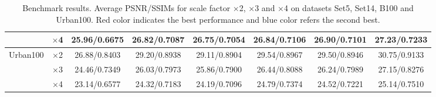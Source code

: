 \documentclass[10pt,twocolumn,letterpaper]{article}
\begin{document}
\begin{table}
\begin{center}
\begin{tabular}{ | c | c | c | c | c | c | c | c | }
 & $\times$4 & 25.96/0.6675 & 26.82/0.7087 & 26.75/0.7054 & 26.84/{\color{blue}0.7106} & {\color{blue}26.90}/0.7101 & {\color{red}27.23}/{\color{red}0.7233}\\
\hline
\hline
\multirow{3}{*}{Urban100} & $\times$2 & 26.88/0.8403 & 29.20/0.8938 & 29.11/0.8904 & {\color{blue}29.54}/{\color{blue}0.8967} & 29.50/0.8946 & {\color{red}30.75}/{\color{red}0.9133}\\
 & $\times$3 & 24.46/0.7349 & 26.03/0.7973 & 25.86/0.7900 & {\color{blue}26.44}/{\color{blue}0.8088} & 26.24/0.7989 & {\color{red}27.15}/{\color{red}0.8276}\\
 & $\times$4 & 23.14/0.6577 & 24.32/0.7183 & 24.19/0.7096 & {\color{blue}24.79}/{\color{blue}0.7374} & 24.52/0.7221 & {\color{red}25.14}/{\color{red}0.7510}\\
\hline
\end{tabular}
\caption{Benchmark results. Average PSNR/SSIMs for scale factor $\times$2, $\times$3 and $\times$4 on datasets Set5, Set14, B100 and Urban100. {\color{red}Red color} indicates the best performance and {\color{blue}blue color} refers the second best.}
\label{tbl:benchmark}
\end{center}
\end{table}
\end{document}
